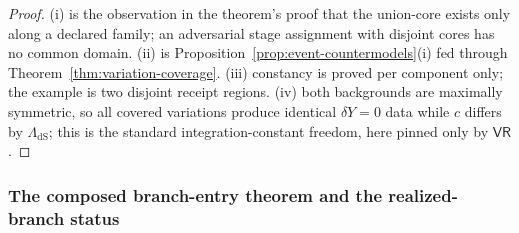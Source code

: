 \documentclass[11pt]{article}
\begin{document}
\begin{proof}
(i) is the observation in the theorem's proof that the union-core exists
only along a declared family; an adversarial stage assignment with disjoint
cores has no common domain. (ii) is
Proposition~\ref{prop:event-countermodels}(i) fed through
Theorem~\ref{thm:variation-coverage}. (iii) constancy is proved per
component only; the example is two disjoint receipt regions. (iv) both
backgrounds are maximally symmetric, so all covered variations produce
identical \(\delta Y=0\) data while \(c\) differs by
\(\Lambda_{\mathrm{dS}}\); this is the standard integration-constant freedom,
here pinned only by \(\mathsf{VR}\).
\end{proof}

\subsubsection{The composed branch-entry theorem and the realized-branch status}
\label{subsubsec:composed-branch-entry}
\end{document}
